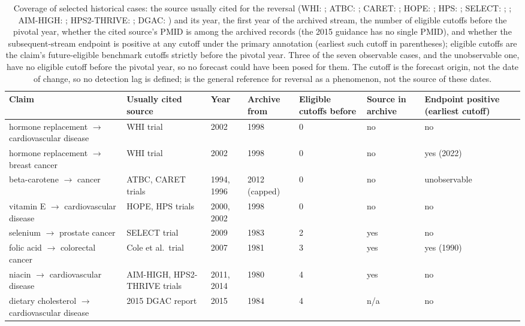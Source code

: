 \documentclass[11pt]{article}
\begin{document}
\begin{table}[!t]\centering\scriptsize
\setlength{\tabcolsep}{3pt}
\begin{tabular}{@{}p{}p{}p{}p{}p{}p{}p{}@{}}
\toprule
Claim & Usually cited source & Year & Archive from & Eligible cutoffs before & Source in archive & Endpoint positive (earliest cutoff) \\
\midrule
hormone replacement $\rightarrow$ cardiovascular disease & WHI trial & 2002 & 1998 & 0 & no & no \\
hormone replacement $\rightarrow$ breast cancer & WHI trial & 2002 & 1998 & 0 & no & yes (2022) \\
beta-carotene $\rightarrow$ cancer & ATBC, CARET trials & 1994, 1996 & 2012 (capped) & 0 & no & unobservable \\
vitamin E $\rightarrow$ cardiovascular disease & HOPE, HPS trials & 2000, 2002 & 1998 & 0 & no & no \\
selenium $\rightarrow$ prostate cancer & SELECT trial & 2009 & 1983 & 2 & yes & no \\
folic acid $\rightarrow$ colorectal cancer & Cole et al.\ trial & 2007 & 1981 & 3 & yes & yes (1990) \\
niacin $\rightarrow$ cardiovascular disease & AIM-HIGH, HPS2-THRIVE trials & 2011, 2014 & 1980 & 4 & yes & no \\
dietary cholesterol $\rightarrow$ cardiovascular disease & 2015 DGAC report & 2015 & 1984 & 4 & n/a & no \\
\bottomrule
\end{tabular}
\caption{Coverage of selected historical cases: the source usually cited for the reversal (WHI:
\citealp{WHI2002}; ATBC: \citealp{ATBC1994}; CARET: \citealp{CARET1996}; HOPE: \citealp{HOPE2000};
HPS: \citealp{HPS2002}; SELECT: \citealp{SELECT2009}; \citealp{Cole2007}; AIM-HIGH:
\citealp{AIMHIGH2011}; HPS2-THRIVE: \citealp{HPS2THRIVE2014}; DGAC: \citealp{DGAC2015}) and its
year, the first year of the archived stream, the number of eligible cutoffs before the pivotal
year, whether the cited source's PMID is among the archived records (the 2015 guidance has no
single PMID), and whether the subsequent-stream endpoint is positive at any cutoff under the
primary annotation (earliest such cutoff in parentheses); eligible cutoffs are the claim's
future-eligible benchmark cutoffs strictly before the pivotal year. Three of the seven observable
cases, and the unobservable one, have no eligible cutoff before the pivotal year, so no forecast
could have been posed for them. The
cutoff is the forecast origin, not the date of change, so no detection lag is defined;
\citet{Prasad2013} is the general reference for reversal as a phenomenon, not the source of these
dates.}
\label{tab:reversals}
\end{table}
\end{document}
